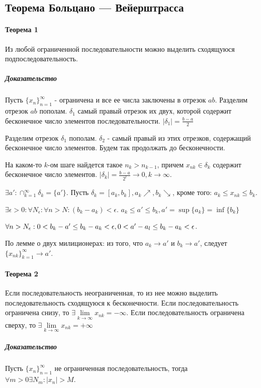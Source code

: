 \documentclass[10pt]{article}
\newcommand{\seq}[2]{ \{#1_{#2}\}_{#2=1}^\infty}
\newcommand{\seqn}[1]{\seq{#1}{n}}
\begin{document}
		\subsection{Теорема Больцано — Вейерштрасса}
			\paragraph{Теорема 1}
			Из любой ограниченной последовательности можно выделить сходящуюся подпоследовательность.
			\subparagraph{Доказательство}
			Пусть $\seqn{x}$ - ограничена и все ее числа заключены в отрезок $ab$.
			Разделим отрезок  $ab$ пополам. $\delta_1$ самый правый отрезок их двух, которой содержит бесконечное число элементов последовательности. $|\delta_1| = \frac{b-a}{2}$
			
			Разделим отрезок $\delta_1$ пополам. $\delta_2$ - самый правый из этих  отрезков, содержащий бесконечное число элементов. Будем так продолжать до бесконечности. 
			
			На каком-то $k$-ом шаге найдется такое $n_k > n_{k-1}$, причем $x_{nk} \in \delta_k$ содержит бесконечное число элементов. $|\delta_k| = \frac{b-a}{2^l} \to 0, k \to \infty$.
			
			$\exists a' : \cap_{k=1}^\infty \delta_k = \{a'\}$. Пусть $\delta_k = [a_k, b_k], a_k \nearrow, b_k \searrow$, кроме того: $a_k \le x_{nk} \le b_k$.
			
			$\exists \epsilon > 0 : \forall N_\epsilon : \forall n > N : (b_k - a_k) < \epsilon$. $a_k \le a' \le b_k, a' = \sup \{a_k\} = \inf \{b_k\}$
			
			$\forall n > N_\epsilon : 0 < b_k - a' \le b_k - a_k < \epsilon, \\ 0 < a' - a_l \le b_k - a_k < \epsilon$.
			
			По лемме о двух милиционерах: из того, что $a_k \to a'$ и $b_k \to a'$, следует $\{x_{nk}\}_{k=1}^\infty \to  a'$.
			
			\paragraph{Теорема 2}
			Если последовательность неограниченная, то из нее можно выделить последовательность сходящуюся к бесконечности. Если последовательность ограничена снизу, то $\exists \lim\limits_{k\to\infty} x_{nk} = -\infty$. Если последовательность ограничена сверху, то $\exists \lim\limits_{k \to \infty} x_{nk} = + \infty$
			\subparagraph{Доказательство}
			Пусть $\seqn{x}$ не ограниченная последовательность, тогда $\forall m > 0 \exists N_m : |x_n| > M$.
			
\end{document}
